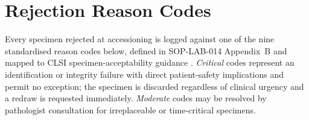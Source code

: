 
\section{Rejection Reason Codes}
\label{sec:codes}

Every specimen rejected at accessioning is logged against one of the nine standardised reason
codes below, defined in SOP-LAB-014 Appendix~B and mapped to CLSI specimen-acceptability
guidance \citep{clsi_gp41,clsi_gp44}. \emph{Critical} codes represent an identification or
integrity failure with direct patient-safety implications and permit no exception; the
specimen is discarded regardless of clinical urgency and a redraw is requested immediately.
\emph{Moderate} codes may be resolved by pathologist consultation for irreplaceable or
time-critical specimens.

